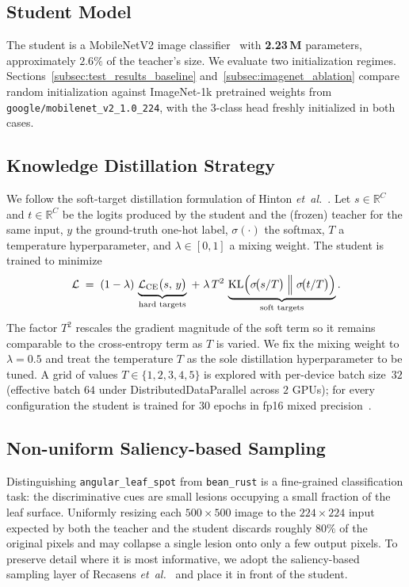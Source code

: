 \documentclass[11pt]{article}
\begin{document}
\subsection{Student Model}
The student is a MobileNetV2 image classifier~\cite{sandler2018mobilenetv2}
with \textbf{2.23\,M} parameters, approximately $2.6\%$ of the teacher's
size.  We evaluate two initialization regimes.  Sections~\ref{subsec:test_results_baseline}
and~\ref{subsec:imagenet_ablation} compare random initialization against
ImageNet-1k pretrained weights from \texttt{google/mobilenet\_v2\_1.0\_224},
with the $3$-class head freshly initialized in both cases.

\subsection{Knowledge Distillation Strategy}
We follow the soft-target distillation formulation of
Hinton \emph{et~al.}~\cite{hinton2015distilling}.  Let $s\in\mathbb{R}^{C}$ and $t\in\mathbb{R}^{C}$
be the logits produced by the student and the (frozen) teacher for the same
input, $y$ the ground-truth one-hot label, $\sigma(\cdot)$ the softmax,
$T$ a temperature hyperparameter, and $\lambda\in[0,1]$ a mixing weight.
The student is trained to minimize
\begin{equation}
\mathcal{L}
\;=\;
(1-\lambda)\,\underbrace{\mathcal{L}_{\text{CE}}\bigl(s,\,y\bigr)}_{\text{hard targets}}
\;+\;
\lambda\,T^{2}\,
\underbrace{\mathrm{KL}\Bigl(\sigma\!\bigl(s/T\bigr)\;\Big\|\;\sigma\!\bigl(t/T\bigr)\Bigr)}_{\text{soft targets}}.
\label{eq:loss}
\end{equation}
The factor $T^{2}$ rescales the gradient magnitude of the soft term so it
remains comparable to the cross-entropy term as $T$ is varied.  We fix the
mixing weight to $\lambda=0.5$ and treat the temperature $T$ as the sole
distillation hyperparameter to be tuned.  A grid of values
$T\in\{1,2,3,4,5\}$ is explored with per-device batch size~$32$ (effective
batch $64$ under DistributedDataParallel across $2$ GPUs); for every
configuration the student is trained for $30$ epochs in fp16 mixed
precision~\cite{micikevicius2018mixed}.

\subsection{Non-uniform Saliency-based Sampling}
\label{subsec:saliency_sampler}

Distinguishing \texttt{angular\_leaf\_spot} from \texttt{bean\_rust} is a
fine-grained classification task: the discriminative cues are small
lesions occupying a small fraction of the leaf surface.  Uniformly resizing
each $500\times500$ image to the $224\times224$ input expected by both the
teacher and the student discards roughly $80\%$ of the original pixels and
may collapse a single lesion onto only a few output pixels.  To preserve
detail where it is most informative, we adopt the saliency-based sampling
layer of Recasens \emph{et~al.}~\cite{recasens2018learning} and place it
in front of the student.
\end{document}
